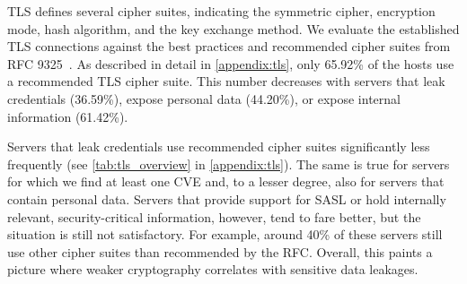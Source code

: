 TLS defines several cipher suites, indicating the symmetric cipher, encryption mode, hash algorithm, and the key exchange method. We evaluate the established TLS connections against the best practices and recommended cipher suites from RFC 9325~\cite{rfc9325}.
As described in detail in \cref{appendix:tls}, only 65.92\% of the hosts use a recommended TLS cipher suite. This number decreases with servers that leak credentials (36.59\%), expose personal data (44.20\%), or expose internal information (61.42\%).

Servers that leak credentials use recommended cipher suites significantly less frequently (see \cref{tab:tls_overview} in \cref{appendix:tls}). The same is true for servers for which we find at least one CVE and, to a lesser degree, also for servers that contain personal data. Servers that provide support for \acrshort{SASL} or hold internally relevant, security-critical information, however, tend to fare better, but the situation is still not satisfactory. For example, around 40\% of these servers still use other cipher suites than recommended by the RFC. Overall, this paints a picture where weaker cryptography correlates with sensitive data leakages.




